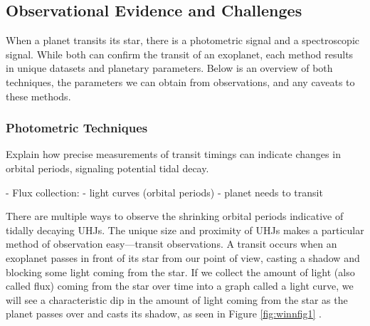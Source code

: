 \documentclass[oneside,12pt]{amsart}
\numberwithin{page}{section}
\begin{document}
\clearpage




\subsection{Observational Evidence and Challenges}\label{sec:obs}

When a planet transits its star, there is a photometric signal and a spectroscopic signal. While both can confirm the transit of an exoplanet, each method results in unique datasets and planetary parameters. Below is an overview of both techniques, the parameters we can obtain from observations, and any caveats to these methods.

\subsubsection{Photometric Techniques}\label{sec:obs-photo}
Explain how precise measurements of transit timings can indicate changes in orbital periods, signaling potential tidal decay.

- Flux collection: 
    - light curves (orbital periods)
    - planet needs to transit

There are multiple ways to observe the shrinking orbital periods indicative of tidally decaying UHJs. The unique size and proximity of UHJs makes a particular method of observation easy—transit observations. A transit occurs when an exoplanet passes in front of its star from our point of view, casting a shadow and blocking some light coming from the star. If we collect the amount of light (also called flux) coming from the star over time into a graph called a light curve, we will see a characteristic dip in the amount of light coming from the star as the planet passes over and casts its shadow, as seen in Figure \ref{fig:winnfig1} \citep{winn2010transits}. 

\end{document}
